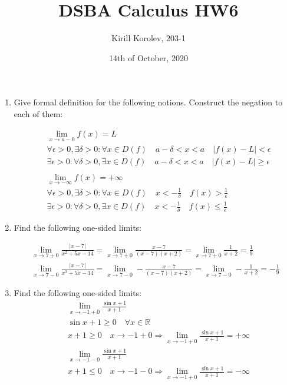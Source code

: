 \documentclass{article}
\title{DSBA Calculus HW6}
\author{Kirill Korolev, 203-1}
\date{14th of October, 2020}
\begin{document}
	
\maketitle

\begin{enumerate}
\item Give formal definition for the following notions. Construct the negation to each of them:

\begin{align*}
&\lim_{x \to a-0} f(x) = L\\
&\forall \epsilon > 0, \exists \delta > 0 : \forall x \in D(f) \quad a - \delta < x < a \quad |f(x) - L| < \epsilon\\
&\exists \epsilon > 0: \forall \delta > 0, \exists x \in D(f) \quad a - \delta < x < a \quad |f(x) - L| \geq \epsilon\\\\
&\lim_{x \to -\infty} f(x) = +\infty\\
&\forall \epsilon > 0, \exists \delta > 0 : \forall x \in D(f) \quad x < -\frac{1}{\delta} \quad f(x) > \frac{1}{\epsilon}\\
&\exists \epsilon > 0: \forall \delta > 0, \exists x \in D(f) \quad x < -\frac{1}{\delta} \quad f(x) \leq \frac{1}{\epsilon}
\end{align*}

\item Find the following one-sided limits:

\begin{align*}
\lim_{x \to 7+0} \frac{|x-7|}{x^2+5x-14} = \lim_{x \to 7+0} \frac{x-7}{(x-7)(x+2)} = \lim_{x \to 7+0} \frac{1}{x+2} = \frac{1}{9}\\
\lim_{x \to 7-0} \frac{|x-7|}{x^2+5x-14} = \lim_{x \to 7-0} -\frac{x-7}{(x-7)(x+2)} = \lim_{x \to 7-0}-\frac{1}{x+2} = -\frac{1}{9}
\end{align*}

\item Find the following one-sided limits:
\begin{align*}
&\lim_{x \to -1+0} \frac{\sin{x} + 1}{x + 1}\\
&\sin{x} + 1 \geq 0 \quad \forall x \in \mathbb{R}\\
&x + 1 \geq 0 \quad x \to -1+0  \Rightarrow
\lim_{x \to -1+0} \frac{\sin{x} + 1}{x + 1} = +\infty\\
&\lim_{x \to -1-0} \frac{\sin{x} + 1}{x + 1}\\
&x + 1 \leq 0 \quad x \to -1-0  \Rightarrow
\lim_{x \to -1+0} \frac{\sin{x} + 1}{x + 1} = -\infty
\end{align*}


\end{enumerate}
\end{document}
